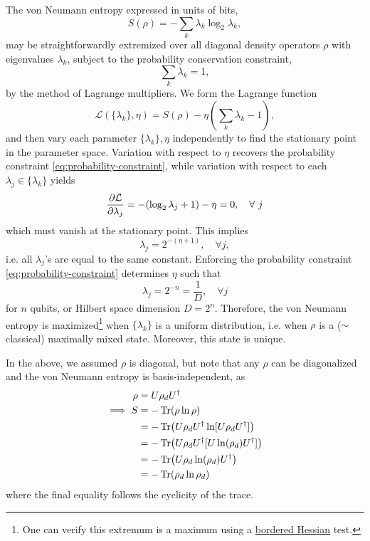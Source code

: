 \documentclass[12pt]{article}
\begin{document}
\begin{appendices}
The von Neumann entropy expressed in units of bits,
\begin{equation}
    S(\rho) = -\sum_k \lambda_k \log_2 \lambda_k,
    \label{eq:von-neumann-entropy}
\end{equation}
may be straightforwardly extremized over all diagonal density operators $\rho$ with eigenvalues $\lambda_k$, subject to the probability conservation constraint,
\begin{equation}
    \sum_k \lambda_k = 1,
    \label{eq:probability-constraint}
\end{equation}
by the method of Lagrange multipliers. We form the Lagrange function
\[\mathcal{L}(\{\lambda_k\}, \eta)
= S(\rho) - \eta\left(\sum_k \lambda_k - 1\right),\]
and then vary each parameter $\{\lambda_k\}, \eta$ independently to find the stationary point in the parameter space. Variation with respect to $\eta$ recovers the probability constraint \eqref{eq:probability-constraint}, while variation with respect to each $\lambda_j \in \{\lambda_k\}$ yields
\[\pdv{\mathcal{L}}{\lambda_j} = -(\log_2\lambda_j + 1) - \eta = 0, \quad \forall\ j\]
which must vanish at the stationary point. This implies
\[\lambda_j = 2^{-(\eta + 1)}, \quad \forall j,\]
i.e. all $\lambda_j$'s are equal to the same constant. Enforcing the probability constraint \eqref{eq:probability-constraint} determines $\eta$ such that
\[\lambda_j = 2^{-n} = \frac{1}{D}, \quad \forall j\]
for $n$ qubits, or Hilbert space dimension $D = 2^n$. Therefore, the von Neumann entropy is maximized\footnote{One can verify this extremum is a maximum using a \href{https://en.wikipedia.org/wiki/Hessian_matrix\#Bordered_Hessian}{bordered Hessian} test.} when $\{\lambda_k\}$ is a uniform distribution, i.e. when $\rho$ is a ($\sim$ classical) maximally mixed state. Moreover, this state is unique.

In the above, we assumed $\rho$ is diagonal, but note that any $\rho$ can be diagonalized and the von Neumann entropy is basis-independent, as
\begin{align}
\rho &= U\rho_d U^{\dagger} \\
\implies S &= -\Tr(\rho \ln\rho) \\
&= -\Tr(U\rho_d U^{\dagger} \ln[U\rho_d U^{\dagger}]) \\
&= -\Tr(U \rho_d U^{\dagger} [U\ln(\rho_d)U^{\dagger}]) \\
&= -\Tr(U\rho_d  \ln(\rho_d)U^{\dagger}) \\
&= -\Tr(\rho_d \ln\rho_d)
\end{align}
where the final equality follows the cyclicity of the trace.


\end{appendices}
\end{document}
